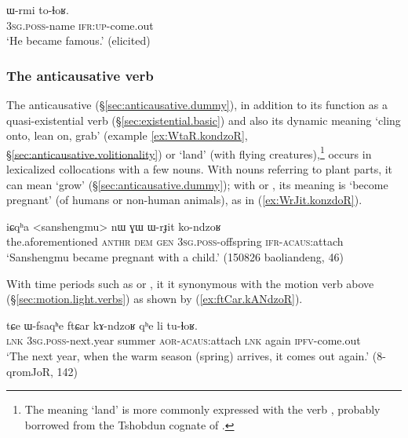 \begin{exe}
\ex \label{ex:Wrmi.tolhoR}
\gll ɯ-rmi to-ɬoʁ. \\
\textsc{3sg}.\textsc{poss}-name \textsc{ifr}:\textsc{up}-come.out \\
\glt `He became famous.' (elicited)
\end{exe}

 \subsubsection{The anticausative verb } \label{sec:ndzoR.light.verbs}
The anticausative  (§\ref{sec:anticausative.dummy}), in addition to its function as a quasi-existential verb (§\ref{sec:existential.basic}) and also its dynamic meaning  `cling onto, lean on, grab' (example \ref{ex:WtaR.kondzoR}, §\ref{sec:anticausative.volitionality}) or `land' (with flying creatures),\footnote{The meaning `land' is more commonly expressed with the verb , probably borrowed from the Tshobdun cognate of . } occurs in lexicalized collocations with a few nouns.  With nouns referring to  plant parts, it can mean `grow' (§\ref{sec:anticausative.dummy}); with  or , its meaning is `become pregnant' (of humans or non-human animals), as in (\ref{ex:WrJit.konzdoR}).

 \begin{exe}
\ex \label{ex:WrJit.konzdoR}
\gll iɕqʰa <sanshengmu> nɯ ɣɯ ɯ-rɟit ko-ndzoʁ \\
the.aforementioned  \textsc{anthr} \textsc{dem} \textsc{gen} \textsc{3sg}.\textsc{poss}-offspring \textsc{ifr}-\textsc{acaus}:attach \\
\glt `Sanshengmu became pregnant with a child.' (150826 baoliandeng, 46)
 \end{exe} 
  
With time periods such as  or , it it synonymous with the motion verb  above (§\ref{sec:motion.light.verbs}) as shown by (\ref{ex:ftCar.kANdzoR}).
  
\begin{exe}
\ex \label{ex:ftCar.kANdzoR}
\gll  tɕe ɯ-fsaqʰe ftɕar kɤ-ndzoʁ qʰe li tu-ɬoʁ. \\
\textsc{lnk} \textsc{3sg}.\textsc{poss}-next.year summer \textsc{aor}-\textsc{acaus}:attach \textsc{lnk} again \textsc{ipfv}-come.out \\
\glt  `The next year, when the warm season (spring) arrives, it comes out again.' (8-qromJoR, 142)
 \end{exe}  

